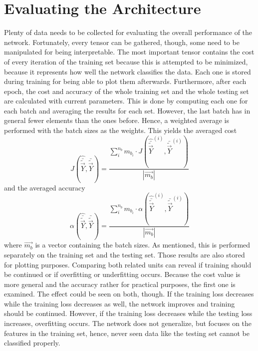 \section{Evaluating the Architecture}
\label{sec:methods-evaluate}
Plenty of data needs to be collected for evaluating the overall performance of the network.
Fortunately, every tensor can be gathered, though, some need to be manipulated for being interpretable.
The most important tensor contains the cost of every iteration of the training set because this is attempted to be minimized, because it represents how well the network classifies the data.
Each one is stored during training for being able to plot them afterwards.
Furthermore, after each epoch, the cost and accuracy of the whole training set and the whole testing set are calculated with current parameters.
This is done by computing each one for each batch and averaging the results for each set.
However, the last batch has in general fewer elements than the ones before.
Hence, a weighted average is performed with the batch sizes as the weights.
This yields the averaged cost
\begin{equation}
	J\left(\hat{\bar{\tilde{\vec{Y}}}}, \bar{\tilde{\vec{Y}}}\right) =  \frac{\sum_{i}^{n_b} m_{b_i} \cdot J\left(\hat{\bar{\tilde{\vec{Y}}}}^{(i)}, \bar{\tilde{\vec{Y}}}^{(i)}\right)}{\left|\vec{m_b}\right|}
\end{equation}
and the averaged accuracy
\begin{equation}
	\alpha\left(\hat{\bar{\tilde{\vec{Y}}}}, \bar{\tilde{\vec{Y}}}\right) =  \frac{\sum_{i}^{n_b} m_{b_i} \cdot \alpha\left(\hat{\bar{\tilde{\vec{Y}}}}^{(i)}, \bar{\tilde{\vec{Y}}}^{(i)}\right)}{\left|\vec{m_b}\right|}
\end{equation}
where $\vec{m_b}$ is a vector containing the batch sizes.
As mentioned, this is performed separately on the training set and the testing set.
Those results are also stored for plotting purposes.
Comparing both related units can reveal if training should be continued or if overfitting or underfitting occurs.
Because the cost value is more general and the accuracy rather for practical purposes, the first one is examined.
The effect could be seen on both, though.
If the training loss decreases while the training loss decreases as well, the network improves and training should be continued.
However, if the training loss decreases while the testing loss increases, overfitting occurs.
The network does not generalize, but focuses on the features in the training set, hence, never seen data like the testing set cannot be classified properly.
